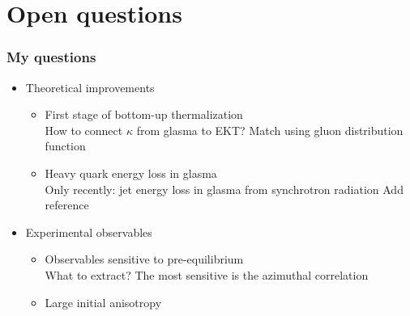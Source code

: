 \documentclass[aspectratio=169,11pt,usenames,dvipsnames]{beamer}
\begin{document}

\section{Open questions}


\begin{frame}
    \frametitle{My questions}
        \begin{itemize}
            \item  {\large{Theoretical improvements}}
                \begin{itemize}
                    \item[\raisebox{0.2em}{\scalebox{0.6}{${\color{ming}\blacktriangleright}$}}] First stage of bottom-up thermalization\\
                    {\scriptsize\color{lightgray}How to connect $\kappa$ from glasma to EKT? Match using gluon distribution function} \\[5pt]
                    \item[\raisebox{0.2em}{\scalebox{0.6}{${\color{ming}\blacktriangleright}$}}] Heavy quark energy loss in glasma \\
                    {\scriptsize\color{lightgray}Only recently: jet energy loss in glasma from synchrotron radiation {\color{jyured}Add reference}}
                \end{itemize}
                \item  {\large{Experimental observables}}
                \begin{itemize}
                    \item[\raisebox{0.2em}{\scalebox{0.6}{${\color{pinky}\blacktriangleright}$}}] Observables sensitive to pre-equilibrium\\
                    {\scriptsize\color{lightgray}What to extract? The most sensitive is the azimuthal correlation} \\[5pt]
                    \item[\raisebox{0.2em}{\scalebox{0.6}{${\color{pinky}\blacktriangleright}$}}] Large initial anisotropy \\

\end{itemize}
\end{itemize}
\end{frame}
\end{document}
